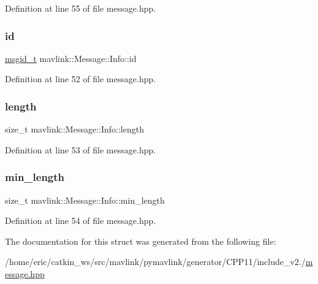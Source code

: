 Definition at line 55 of file message.\+hpp.

\mbox{\label{structmavlink_1_1Message_1_1Info_ae5984fd30d3e9ec4412386f88cfbe8be}} 
\subsubsection{\texorpdfstring{id}{id}}
{\footnotesize\ttfamily \mbox{\hyperlink{namespacemavlink_a98a1fe49b380ed1ea252d2c13bf3278d}{msgid\+\_\+t}} mavlink\+::\+Message\+::\+Info\+::id}



Definition at line 52 of file message.\+hpp.

\mbox{\label{structmavlink_1_1Message_1_1Info_ab304bd0b3dbc5ddedb4e5d622c68f21e}} 
\subsubsection{\texorpdfstring{length}{length}}
{\footnotesize\ttfamily size\+\_\+t mavlink\+::\+Message\+::\+Info\+::length}



Definition at line 53 of file message.\+hpp.

\mbox{\label{structmavlink_1_1Message_1_1Info_aecb3d686fd15622b3e5a57ce4126dd36}} 
\subsubsection{\texorpdfstring{min\_length}{min\_length}}
{\footnotesize\ttfamily size\+\_\+t mavlink\+::\+Message\+::\+Info\+::min\+\_\+length}



Definition at line 54 of file message.\+hpp.



The documentation for this struct was generated from the following file\+:\begin{DoxyCompactItemize}
\item 
/home/eric/catkin\+\_\+ws/src/mavlink/pymavlink/generator/\+C\+P\+P11/include\+\_\+v2./\mbox{\hyperlink{message_8hpp}{message.\+hpp}}\end{DoxyCompactItemize}
